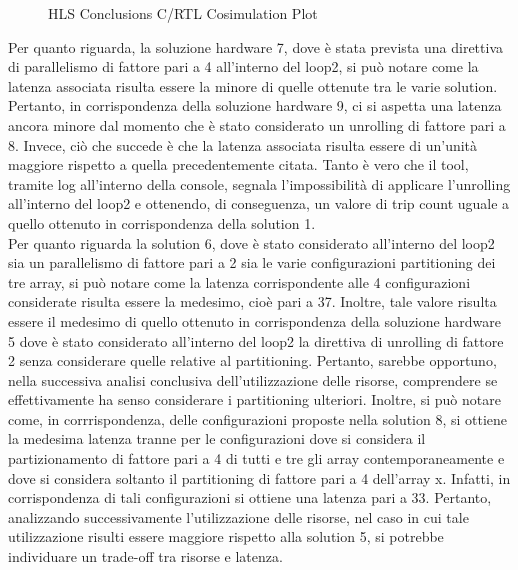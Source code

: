 \begin{figure}[H]
	\caption{HLS Conclusions C/RTL Cosimulation Plot}
	\label{fig:hls-conclusions-cosimulation-plot}
\end{figure}

Per quanto riguarda, la soluzione hardware 7, dove è stata prevista una direttiva di parallelismo di fattore pari a 4 all'interno del loop2, si può notare come la latenza associata risulta essere la minore di quelle ottenute tra le varie solution. Pertanto, in corrispondenza della soluzione hardware 9, ci si aspetta una latenza ancora minore dal momento che è stato considerato un unrolling di fattore pari a 8. Invece, ciò che succede è che la latenza associata risulta essere di un'unità maggiore rispetto a quella precedentemente citata. Tanto è vero che il tool, tramite log all'interno della console, segnala l'impossibilità di applicare l'unrolling all'interno del loop2 e ottenendo, di conseguenza, un valore di trip count uguale a quello ottenuto in corrispondenza della solution 1. 
\\
Per quanto riguarda la solution 6, dove è stato considerato all'interno del loop2 sia un parallelismo di fattore pari a 2 sia le varie configurazioni partitioning dei tre array, si può notare come la latenza corrispondente alle 4 configurazioni considerate risulta essere la medesimo, cioè pari a 37. Inoltre, tale valore risulta essere il medesimo di quello ottenuto in corrispondenza della soluzione hardware 5 dove è stato considerato all'interno del loop2 la direttiva di unrolling di fattore 2 senza considerare quelle relative al partitioning. Pertanto, sarebbe opportuno, nella successiva analisi conclusiva dell'utilizzazione delle risorse, comprendere se effettivamente ha senso considerare i partitioning ulteriori. Inoltre, si può notare come, in corrrispondenza, delle configurazioni proposte nella solution 8, si ottiene la medesima latenza tranne per le configurazioni dove si considera il partizionamento di fattore pari a 4 di tutti e tre gli array contemporaneamente e dove si considera soltanto il partitioning di fattore pari a 4 dell'array x. Infatti, in corrispondenza di tali configurazioni si ottiene una latenza pari a 33. Pertanto, analizzando successivamente l'utilizzazione delle risorse, nel caso in cui tale utilizzazione risulti essere maggiore rispetto alla solution 5, si potrebbe individuare un trade-off tra risorse e latenza.

